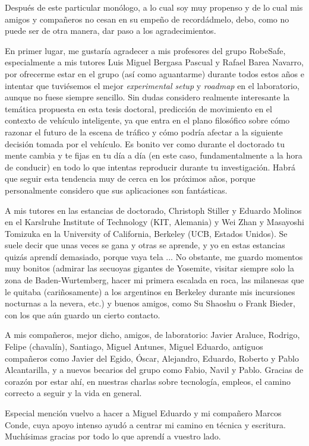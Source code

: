 Después de este particular monólogo, a lo cual soy muy propenso y de lo cual mis amigos y compañeros no cesan en su empeño de recordádmelo, debo, como no puede ser de otra manera, dar paso a los agradecimientos.

En primer lugar, me gustaría agradecer a mis profesores del grupo RobeSafe, especialmente a mis tutores Luis Miguel Bergasa Pascual y Rafael Barea Navarro, por ofrecerme estar en el grupo (así como aguantarme) durante todos estos años e intentar que tuviésemos el mejor \textit{experimental setup} y \textit{roadmap} en el laboratorio, aunque no fuese siempre sencillo. Sin dudas considero realmente interesante la temática propuesta en esta tesis doctoral, predicción de movimiento en el contexto de vehículo inteligente, ya que entra en el plano filosófico sobre cómo razonar el futuro de la escena de tráfico y cómo podría afectar a la siguiente decisión tomada por el vehículo. Es bonito ver como durante el doctorado tu mente cambia y te fijas en tu día a día (en este caso, fundamentalmente a la hora de conducir) en todo lo que intentas reproducir durante tu investigación. Habrá que seguir esta tendencia muy de cerca en los próximos años, porque personalmente considero que sus aplicaciones son fantásticas.

A mis tutores en las estancias de doctorado, Christoph Stiller y Eduardo Molinos en el Karslruhe Institute of Technology (KIT, Alemania) y Wei Zhan y Masayoshi Tomizuka en la University of California, Berkeley (UCB, Estados Unidos). Se suele decir que unas veces se gana y otras se aprende, y yo en estas estancias quizás aprendí demasiado, porque vaya tela ... No obstante, me guardo momentos muy bonitos (admirar las secuoyas gigantes de Yosemite, visitar siempre solo la zona de Baden-Wurtemberg, hacer mi primera escalada en roca, las milanesas que le quitaba (cariñosamente) a los argentinos en Berkeley durante mis incursiones nocturnas a la nevera, etc.) y buenos amigos, como Su Shaoshu o Frank Bieder, con los que aún guardo un cierto contacto. 

A mis compañeros, mejor dicho, amigos, de laboratorio: Javier Araluce, Rodrigo, Felipe (chavalín), Santiago, Miguel Antunes, Miguel Eduardo, antiguos compañeros como Javier del Egido, Óscar, Alejandro, Eduardo, Roberto y Pablo Alcantarilla, y a nuevos becarios del grupo como Fabio, Navil y Pablo. Gracias de corazón por estar ahí, en nuestras charlas sobre tecnología, empleos, el camino correcto a seguir y la vida en general.

Especial mención vuelvo a hacer a Miguel Eduardo y mi compañero Marcos Conde, cuya apoyo intenso ayudó a centrar mi camino en técnica y escritura. Muchísimas gracias por todo lo que aprendí a vuestro lado. 

